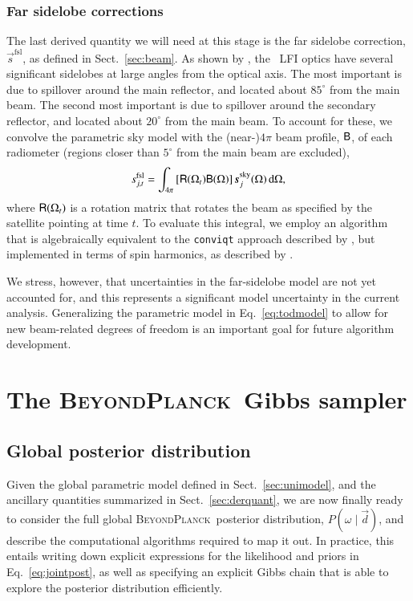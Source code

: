\documentclass[twocolumn]{aa}
\renewcommand{\d}[0]{\vec{d}}
\newcommand{\s}[0]{\vec{s}}
\newcommand{\B}[0]{\tens{B}}
\newcommand{\R}[0]{\tens{R}}
\newcommand{\BP}{\textsc{BeyondPlanck}}
\begin{document}
\subsubsection{Far sidelobe corrections}
\label{sec:fsl}

The last derived quantity we will need at this stage is the far
sidelobe correction, $\s^{\mathrm{fsl}}$, as defined in
Sect.~\ref{sec:beam}. As shown by \citet{planck2014-a05}, the
\Planck\ LFI optics have several significant sidelobes at large angles
from the optical axis.  The most important is due to spillover around
the main reflector, and located about $85^{\circ}$ from the main
beam. The second most important is due to spillover around the
secondary reflector, and located about $20^{\circ}$ from the main
beam. To account for these, we convolve the parametric sky model with
the (near-)$4\pi$ beam profile, $\B$, of each radiometer (regions
closer than $5^{\circ}$ from the main beam are excluded),
\begin{equation}
  s^{\mathrm{fsl}}_{j,t} = \int_{4\pi} \left[\R(\Omega_t)\B(\Omega) \right]\s^{\mathrm{sky}}_j(\Omega)
  \,\mathrm d\Omega,
\end{equation}
where $\R(\Omega_t)$ is a rotation matrix that rotates the beam as
specified by the satellite pointing at time $t$.  To evaluate this
integral, we employ an algorithm that is algebraically equivalent to
the \texttt{conviqt} approach described by \citet{prezeau:2010}, but
implemented in terms of spin harmonics, as described by
\citet{bp08}.

We stress, however, that uncertainties in the far-sidelobe model are
not yet accounted for, and this represents a significant model
uncertainty in the current analysis. Generalizing the parametric model
in Eq.~\eqref{eq:todmodel} to allow for new beam-related degrees of
freedom is an important goal for future algorithm development.

\section{The \BP\ Gibbs sampler}
\label{sec:posterior}

\subsection{Global posterior distribution}

Given the global parametric model defined in Sect.~\ref{sec:unimodel},
and the ancillary quantities summarized in Sect.~\ref{sec:derquant},
we are now finally ready to consider the full global \BP\ posterior
distribution, $P(\omega\mid \d)$, and describe the computational
algorithms required to map it out. In practice, this entails writing
down explicit expressions for the likelihood and priors in
Eq.~\eqref{eq:jointpost}, as well as specifying an explicit Gibbs chain
that is able to explore the posterior distribution efficiently.
\end{document}
